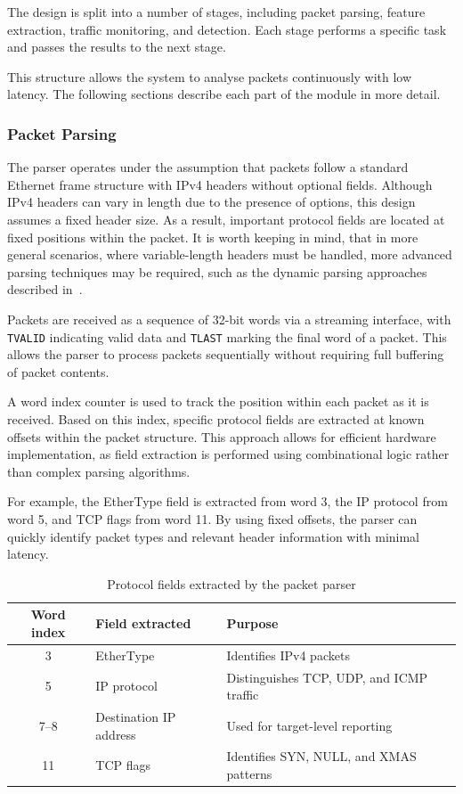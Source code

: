 The design is split into a number of stages, including packet parsing, feature
extraction, traffic monitoring, and detection. Each stage performs a specific
task and passes the results to the next stage.

This structure allows the system to analyse packets continuously with low
latency. The following sections describe each part of the module in more detail.

\subsubsection{Packet Parsing}
The parser operates under the assumption that packets follow a standard
Ethernet frame structure with IPv4 headers without optional fields. Although
IPv4 headers can vary in length due to the presence of options, this design
assumes a fixed header size. As a result, important protocol fields are located
at fixed positions within the packet. It is worth keeping in mind, that in more
general scenarios, where variable-length headers must be handled, more advanced
parsing techniques may be required, such as the dynamic parsing approaches
described in~\cite{attig_400_2011}.

Packets are received as a sequence of 32-bit words via a streaming interface,
with \texttt{TVALID} indicating valid data and \texttt{TLAST} marking the final
word of a packet. This allows the parser to process packets sequentially
without requiring full buffering of packet contents.


A word index counter is used to track the position within each packet as it is
received. Based on this index, specific protocol fields are extracted at known
offsets within the packet structure. This approach allows for efficient
hardware implementation, as field extraction is performed using combinational
logic rather than complex parsing algorithms.

For example, the EtherType field is extracted from word 3, the IP protocol from
word 5, and TCP flags from word 11. By using fixed offsets, the parser can
quickly identify packet types and relevant header information with minimal
latency.


\begin{table}[H]
    \centering
    \caption{Protocol fields extracted by the packet parser}
    \label{tab:parser_fields}
    \begin{tabular}{c l l}
        \hline
        \textbf{Word index} & \textbf{Field extracted} & \textbf{Purpose}                         \\
        \hline
        3                   & EtherType                & Identifies IPv4 packets                  \\
        5                   & IP protocol              & Distinguishes TCP, UDP, and ICMP traffic \\
        7--8                & Destination IP address   & Used for target-level reporting          \\
        11                  & TCP flags                & Identifies SYN, NULL, and XMAS patterns  \\
        \hline
    \end{tabular}
\end{table}

